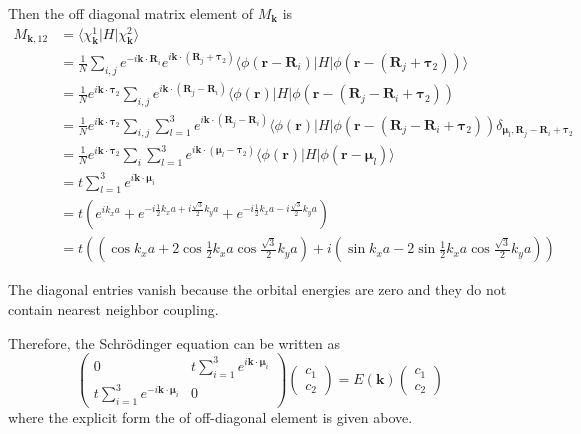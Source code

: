 \documentclass{article}
\begin{document}
Then the off diagonal matrix element of $M_{\mathbf{k}}$ is
\begin{align*}
	M_{\mathbf{k},12}&=\langle\chi_{\mathbf{k}}^1|H|\chi_{\mathbf{k}}^2\rangle\\
	&=\frac{1}{N}\sum_{i,j}e^{-i\mathbf{k}\cdot\mathbf{R}_i}e^{i\mathbf{k}\cdot(\mathbf{R}_j+\bm{\tau}_2)}\langle\phi(\mathbf{r}-\mathbf{R}_i)|H|\phi(\mathbf{r}-(\mathbf{R}_j+\bm{\tau}_2))\rangle\\
	&=\frac{1}{N}e^{i\mathbf{k}\cdot\bm{\tau}_2}\sum_{i,j}e^{i\mathbf{k}\cdot(\mathbf{R}_j-\mathbf{R}_i)}\langle\phi(\mathbf{r})|H|\phi(\mathbf{r}-(\mathbf{R}_j-\mathbf{R}_i+\bm{\tau}_2))\\
	&=\frac{1}{N}e^{i\mathbf{k}\cdot\bm{\tau}_2}\sum_{i,j}\sum_{l=1}^3e^{i\mathbf{k}\cdot(\mathbf{R}_j-\mathbf{R}_i)}\langle\phi(\mathbf{r})|H|\phi(\mathbf{r}-(\mathbf{R}_j-\mathbf{R}_i+\bm{\tau}_2))\delta_{\bm{\mu}_l,\mathbf{R}_j-\mathbf{R}_i+\bm{\tau}_2}\\
	&=\frac{1}{N}e^{i\mathbf{k}\cdot\bm{\tau}_2}\sum_i\sum_{l=1}^3e^{i\mathbf{k}\cdot(\bm{\mu}_l-\bm{\tau}_2)}\langle\phi(\mathbf{r})|H|\phi(\mathbf{r}-\bm{\mu}_l)\rangle\\
	&=t\sum_{l=1}^3e^{i\mathbf{k}\cdot\bm{\mu}_i}\\
	&=t\left(e^{ik_xa}+e^{-i\frac{1}{2}k_xa+i\frac{\sqrt{3}}{2}k_ya}+e^{-i\frac{1}{2}k_xa-i\frac{\sqrt{3}}{2}k_ya}\right)\\
	&=t\left(\left(\cos k_xa+2\cos\frac{1}{2}k_xa\cos\frac{\sqrt{3}}{2}k_ya\right)+i\left(\sin k_xa-2\sin\frac{1}{2}k_xa\cos\frac{\sqrt{3}}{2}k_ya\right)\right)
\end{align*}

The diagonal entries vanish because the orbital energies are zero and they do not contain nearest neighbor coupling.

Therefore, the Schr\"{o}dinger equation can be written as
\begin{equation*}
	\left(\begin{array}{cc}0&t\displaystyle{\sum_{i=1}^3}e^{i\mathbf{k}\cdot\bm{\mu}_i}\\t\displaystyle{\sum_{i=1}^3}e^{-i\mathbf{k}\cdot\bm{\mu}_i}&0\end{array}\right)\left(\begin{array}{c}c_1\\c_2\end{array}\right)=E(\mathbf{k})\left(\begin{array}{c}c_1\\c_2\end{array}\right)
\end{equation*}
where the explicit form the of off-diagonal element is given above.
\end{document}
